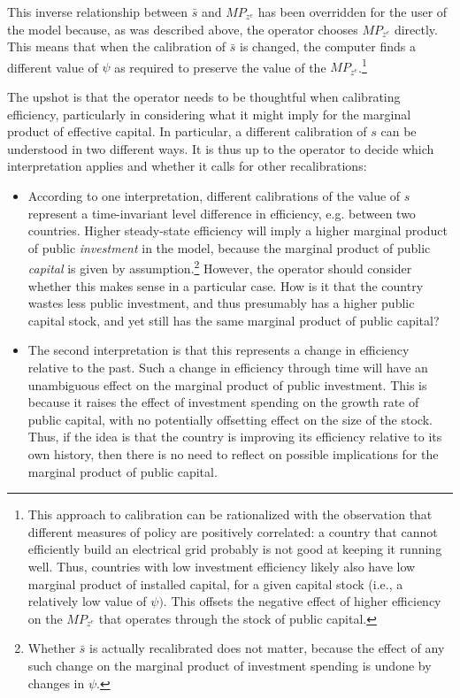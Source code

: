 \documentclass[11pt]{article}
\begin{document}
\begin{appendix}
This inverse relationship between $\bar{s}$ and $MP_{z^{e}}$ has been
overridden for the user of the model because, as was described above, the
operator chooses $MP_{z^{e}}$ directly. This means that when the calibration
of $\bar{s}$ is changed, the computer finds a different value of $\psi $ as
required to preserve the value of the $MP_{z^{e}}$.\footnote{%
This approach to calibration can be rationalized with the observation that
different measures of policy are positively correlated: a country that
cannot efficiently build an electrical grid probably is not good at keeping
it running well. Thus, countries with low investment efficiency likely also
have low marginal product of installed capital, for a given capital stock
(i.e., a relatively low value of $\psi )$. This offsets the negative effect
of higher efficiency on the $MP_{z^{e}}$ that operates through the stock of
public capital.}

The upshot is that the operator needs to be thoughtful when calibrating
efficiency, particularly in considering what it might imply for the marginal
product of effective capital. In particular, a different calibration of $s$
can be understood in two different ways. It is thus up to the operator to
decide which interpretation applies and whether it calls for other
recalibrations:

\begin{itemize}
\item According to one interpretation, different calibrations of the value
of $s$ represent a time-invariant level difference in efficiency, e.g.
between two countries. Higher steady-state efficiency will imply a higher
marginal product of public \textit{investment} in the model, because the
marginal product of public \textit{capital} is given by assumption.\footnote{%
Whether $\bar{s}$ is actually recalibrated does not matter, because the
effect of any such change on the marginal product of investment spending is
undone by changes in $\psi $.} However, the operator should consider whether
this makes sense in a particular case. How is it that the country wastes
less public investment, and thus presumably has a higher public capital
stock, and yet still has the same marginal product of public capital?

\item The second interpretation is that this represents a change in
efficiency relative to the past. Such a change in efficiency through time
will have an unambiguous effect on the marginal product of public
investment. This is because it raises the effect of investment spending on
the growth rate of public capital, with no potentially offsetting effect on
the size of the stock. Thus, if the idea is that the country is improving
its efficiency relative to its own history, then there is no need to reflect
on possible implications for the marginal product of public capital.
\end{itemize}


\end{appendix}
\end{document}
